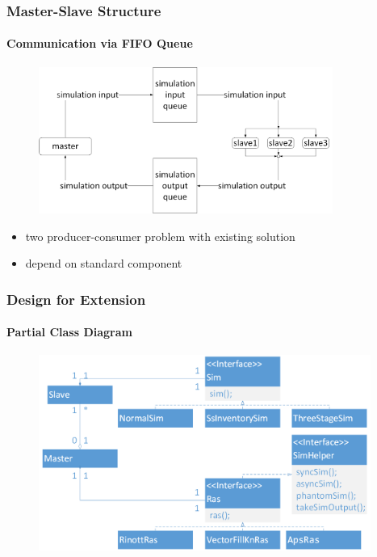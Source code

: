 \documentclass{beamer}
\begin{document}
\begin{frame}
\frametitle{Master-Slave Structure}
\framesubtitle{Communication via FIFO Queue}
\begin{figure}[ht]
\centering
\includegraphics[height=48mm]{master-slave-queue.png}
\end{figure}
\begin{itemize}
\item two producer-consumer problem with existing solution
\item depend on standard component
\end{itemize}
\end{frame}

\begin{frame}
\frametitle{Design for Extension}
\framesubtitle{Partial Class Diagram}
\begin{figure}[ht]
\centering
\includegraphics[height=64mm]{ras-sim-class.png}
\end{figure}
\end{frame}
\end{document}
